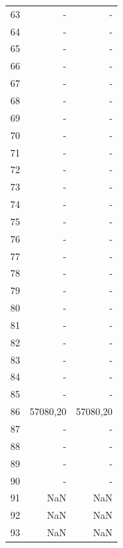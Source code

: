 \begin{appendix}
\begin{table}[h!]
\begin{tabular}{|l|r|r|}
63&-             & -             \\
64&-             & -             \\
65&-             & -             \\
66&-             & -             \\
67&-             & -             \\
68&-             & -             \\
69&-             & -             \\
70&-             & -             \\
71&-             & -             \\
72&-             & -             \\
73&-             & -             \\
74&-             & -             \\
75&-             & -             \\
76&-             & -             \\
77&-             & -             \\
78&-             & -             \\
79&-             & -             \\
80&-             & -             \\
81&-             & -             \\
82&-             & -             \\
83&-             & -             \\
84&-             & -             \\
85&-             & -             \\
86&57080,20 & 57080,20 \\
87&-             & -             \\
88&-             & -             \\
89&-             & -             \\
90&-             & -             \\
91&NaN           & NaN           \\
92&NaN           & NaN           \\
93&NaN           & NaN          \\\hline
\end{tabular}
\label{ap:tab1}
\end{table}
\pagebreak



\end{appendix}
